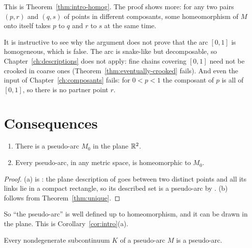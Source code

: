 
This is Theorem~\ref{thm:intro-homog}. The proof shows more: for any two pairs $(p,r)$ and
$(q,s)$ of points in different composants, some homeomorphism of $M$ onto itself takes $p$ to $q$
and $r$ to $s$ at the same time.

\begin{remark}
It is instructive to see why the argument does not prove that the arc $[0,1]$ is homogeneous,
which is false. The arc is snake-like but decomposable, so Chapter~\ref{ch:descriptions} does not
apply: fine chains covering $[0,1]$ need not be crooked in coarse ones
(Theorem~\ref{thm:eventually-crooked} fails). And even the input of Chapter~\ref{ch:composants}
fails: for $0<p<1$ the composant of $p$ is all of $[0,1]$, so there is no partner point $r$.
\end{remark}

\section{Consequences}\label{sec:main-cons}

\begin{corollary}\label{cor:plane-unique}
\begin{enumerate}[label=(\alph*)]
\item There is a pseudo-arc $M_0$ in the plane $\mathbb{R}^2$.
\item Every pseudo-arc, in any metric space, is homeomorphic to $M_0$.
\end{enumerate}
\end{corollary}

\begin{proof}
(a) is : the plane description of  goes between two distinct
points and all its links lie in a compact rectangle, so its described set is a pseudo-arc by
. (b) follows from Theorem~\ref{thm:unique}.
\end{proof}


So ``the pseudo-arc'' is well defined up to homeomorphism, and it can be drawn in the plane. This
is Corollary~\ref{cor:intro}(a).

\begin{lemma}\label{lem:sub-pseudoarc}
Every nondegenerate subcontinuum $K$ of a pseudo-arc $M$ is a pseudo-arc.
\end{lemma}

